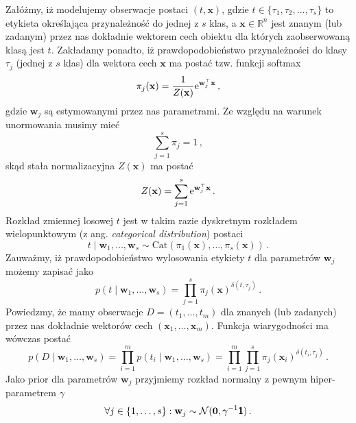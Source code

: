 \documentclass{myclass}
\begin{document}
Załóżmy, iż modelujemy obserwacje postaci \((t,\mathbf{x})\), gdzie \(t \in
\{\tau_1,\tau_2,\ldots,\tau_s\}\) to etykieta określająca przynależność do jednej z \(s\) klas, a
\(\mathbf{x} \in \mathbb{R}^n\) jest znanym (lub zadanym) przez nas dokładnie wektorem cech obiektu
dla których zaobserwowaną klasą jest \(t\). Zakładamy ponadto, iż prawdopodobieństwo przynależności
do klasy \(\tau_j\) (jednej z \(s\) klas) dla wektora cech \(\mathbf{x}\) ma postać tzw. funkcji
softmax
\begin{equation*}
    \pi_j(\mathbf{x}) = \frac{1}{Z(\mathbf{x})}\mathrm{e}^{\mathbf{w}_j^\top\mathbf{x}}\,,
\end{equation*}
gdzie \(\mathbf{w}_j\) są estymowanymi przez nas parametrami. Ze względu na warunek unormowania
musimy mieć
\begin{equation*}
    \sum_{j=1}^s \pi_j = 1\,,
\end{equation*}
skąd stała normalizacyjna \(Z(\mathbf{x})\) ma postać
\begin{equation*}
    Z(\mathbf{x}) = \sum_{j=1}^s \mathrm{e}^{\mathbf{w}_j^\top\mathbf{x}}\,.
\end{equation*}
Rozkład zmiennej losowej \(t\) jest  w takim razie dyskretnym rozkładem wielopunktowym (z ang.
\textit{categorical distribution}) postaci
\begin{equation*}
    t \mid \mathbf{w}_1,\ldots,\mathbf{w}_s \sim \text{Cat}(\pi_1(\mathbf{x}),\ldots,\pi_s(\mathbf{x}))\,.
\end{equation*}
Zauważmy, iż prawdopodobieństwo wylosowania etykiety \(t\) dla parametrów \(\mathbf{w}_j\) możemy
zapisać jako
\begin{equation*}
    p(t \mid \mathbf{w}_1,\ldots,\mathbf{w}_s) = \prod_{j=1}^s \pi_j(\mathbf{x})^{\delta(t,\tau_j)}\,.
\end{equation*}
Powiedzmy, że mamy obserwacje \(D = (t_1,\ldots,t_m)\) dla znanych (lub zadanych) przez nas
dokładnie wektorów cech \((\mathbf{x}_1, \ldots, \mathbf{x}_m)\). Funkcja wiarygodności ma wówczas
postać
\begin{equation*}
    p(D \mid \mathbf{w}_1,\ldots,\mathbf{w}_s) = \prod_{i=1}^m p(t_i \mid \mathbf{w}_1,\ldots,\mathbf{w}_s) = \prod_{i=1}^m \prod_{j=1}^s \pi_j(\mathbf{x}_i)^{\delta(t_i,\tau_j)}\,.
\end{equation*}
Jako prior dla parametrów \(\mathbf{w}_j\) przyjmiemy rozkład normalny z pewnym hiper-parametrem
\(\gamma\)
\begin{equation*}
    \forall j\in \{1,\ldots,s\} : \mathbf{w}_j \sim \mathcal{N}(\mathbf{0}, \gamma^{-1}\boldsymbol{\mathsf{1}})\,.
\end{equation*}
\end{document}
